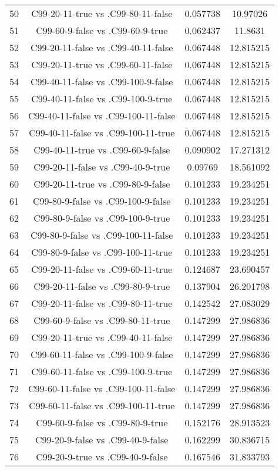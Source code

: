 \documentclass[a4paper,10pt]{article}
\begin{document}
\begin{landscape}
\begin{table}[!htp]
\begin{tabular}{cccc}
50&C99-20-11-true vs .C99-80-11-false&0.057738&10.97026\\
51&C99-60-9-false vs .C99-60-9-true&0.062437&11.8631\\
52&C99-20-11-false vs .C99-40-11-false&0.067448&12.815215\\
53&C99-20-11-true vs .C99-60-11-false&0.067448&12.815215\\
54&C99-40-11-false vs .C99-100-9-false&0.067448&12.815215\\
55&C99-40-11-false vs .C99-100-9-true&0.067448&12.815215\\
56&C99-40-11-false vs .C99-100-11-false&0.067448&12.815215\\
57&C99-40-11-false vs .C99-100-11-true&0.067448&12.815215\\
58&C99-40-11-true vs .C99-60-9-false&0.090902&17.271312\\
59&C99-20-11-false vs .C99-40-9-true&0.09769&18.561092\\
60&C99-20-11-true vs .C99-80-9-false&0.101233&19.234251\\
61&C99-80-9-false vs .C99-100-9-false&0.101233&19.234251\\
62&C99-80-9-false vs .C99-100-9-true&0.101233&19.234251\\
63&C99-80-9-false vs .C99-100-11-false&0.101233&19.234251\\
64&C99-80-9-false vs .C99-100-11-true&0.101233&19.234251\\
65&C99-20-11-false vs .C99-60-11-true&0.124687&23.690457\\
66&C99-20-11-false vs .C99-80-9-true&0.137904&26.201798\\
67&C99-20-11-false vs .C99-80-11-true&0.142542&27.083029\\
68&C99-60-9-false vs .C99-80-11-true&0.147299&27.986836\\
69&C99-20-11-true vs .C99-40-11-false&0.147299&27.986836\\
70&C99-60-11-false vs .C99-100-9-false&0.147299&27.986836\\
71&C99-60-11-false vs .C99-100-9-true&0.147299&27.986836\\
72&C99-60-11-false vs .C99-100-11-false&0.147299&27.986836\\
73&C99-60-11-false vs .C99-100-11-true&0.147299&27.986836\\
74&C99-60-9-false vs .C99-80-9-true&0.152176&28.913523\\
75&C99-20-9-false vs .C99-40-9-false&0.162299&30.836715\\
76&C99-20-9-true vs .C99-40-9-false&0.167546&31.833793\\

\end{tabular}
\end{table}
\end{landscape}
\end{document}
